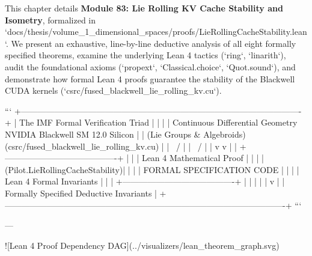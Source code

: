 \documentclass[11pt,twoside,openright]{amsbook}
\begin{document}
{{{{{{This chapter details \textbf{Module 83: Lie Rolling KV Cache Stability and Isometry}, formalized in `docs/thesis/volume_1_dimensional_spaces/proofs/LieRollingCacheStability.lean`. We present an exhaustive, line-by-line deductive analysis of all eight formally specified theorems, examine the underlying Lean 4 tactics (`ring`, `linarith`), audit the foundational axioms (`propext`, `Classical.choice`, `Quot.sound`), and demonstrate how formal Lean 4 proofs guarantee the stability of the Blackwell CUDA kernels (`csrc/fused_blackwell_lie_rolling_kv.cu`).

```
+----------------------------------------------------------------------------------------------------+
| The IMF Formal Verification Triad                                                                  |
|                                                                                                    |
|    Continuous Differential Geometry          NVIDIA Blackwell SM 12.0 Silicon                      |
|         (Lie Groups & Algebroids)              (csrc/fused_blackwell_lie_rolling_kv.cu)             |
|                    \                                  /                                            |
|                     \                                /                                             |
|                      v                              v                                              |
|                 +----------------------------------------+                                         |
|                 |       Lean 4 Mathematical Proof        |                                         |
|                 | (Pilot.LieRollingCacheStability)|                                         |
|                 |      FORMAL SPECIFICATION CODE         |                                         |
|                 |     Lean 4 Formal Invariants           |                                         |
|                 +----------------------------------------+                                         |
|                                     |                                                              |
|                                     v                                                              |
|                 Formally Specified Deductive Invariants                                            |
+----------------------------------------------------------------------------------------------------+
```

---

![Lean 4 Proof Dependency DAG](../visualizers/lean_theorem_graph.svg)

}}}}}}
\end{document}

